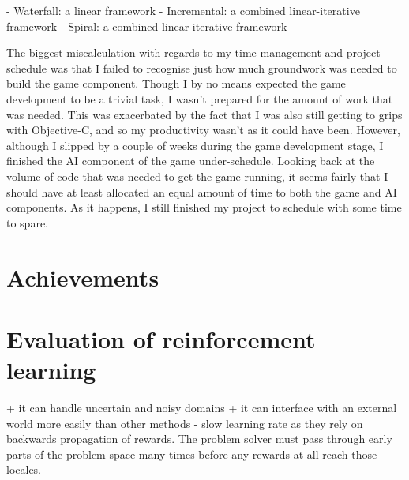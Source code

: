 \documentclass[a4paper,oneside]{report}
\begin{document}
- Waterfall: a linear framework
- Incremental: a combined linear-iterative framework
- Spiral: a combined linear-iterative framework
		
The biggest miscalculation with regards to my time-management and project schedule was that I failed to recognise just how much groundwork was needed to build the game component. Though I by no means expected the game development to be a trivial task, I wasn't prepared for the amount of work that was needed. This was exacerbated by the fact that I was also still getting to grips with Objective-C, and so my productivity wasn't as it could have been. However, although I slipped by a couple of weeks during the game development stage, I finished the AI component of the game under-schedule. Looking back at the volume of code that was needed to get the game running, it seems fairly that I should have at least allocated an equal amount of time to both the game and AI components. As it happens, I still finished my project to schedule with some time to spare.

\section{Achievements}

\section{Evaluation of reinforcement learning}

+ it can handle uncertain and noisy domains
+ it can interface with an external world more easily than other methods
- slow learning rate as they rely on backwards propagation of rewards. The problem solver must pass through early parts of the problem space many times before any rewards at all reach those locales.
\end{document}
